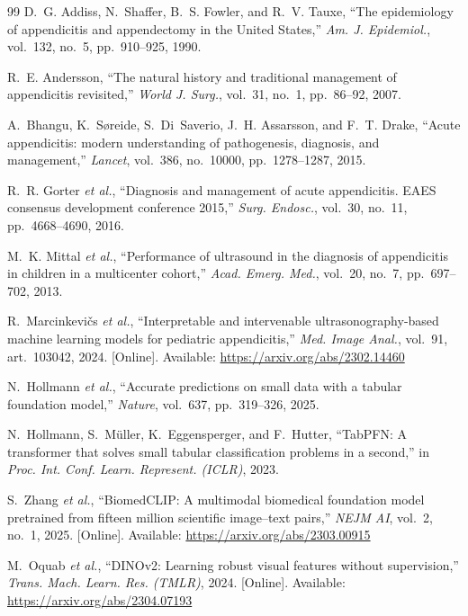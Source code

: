 \documentclass[journal]{IEEEtran}
\begin{document}
\begin{thebibliography}{99}
 D.~G. Addiss, N.~Shaffer, B.~S. Fowler, and R.~V.
Tauxe, ``The epidemiology of appendicitis and appendectomy in the United States,''
\emph{Am. J. Epidemiol.}, vol.~132, no.~5, pp.~910--925, 1990.

 R.~E. Andersson, ``The natural history and traditional
management of appendicitis revisited,'' \emph{World J. Surg.}, vol.~31, no.~1,
pp.~86--92, 2007.

 A.~Bhangu, K.~S{\o}reide, S.~Di~Saverio, J.~H. Assarsson, and
F.~T. Drake, ``Acute appendicitis: modern understanding of pathogenesis, diagnosis, and
management,'' \emph{Lancet}, vol.~386, no.~10000, pp.~1278--1287, 2015.

 R.~R. Gorter \emph{et al.}, ``Diagnosis and management of
acute appendicitis. EAES consensus development conference 2015,'' \emph{Surg. Endosc.},
vol.~30, no.~11, pp.~4668--4690, 2016.

 M.~K. Mittal \emph{et al.}, ``Performance of ultrasound
in the diagnosis of appendicitis in children in a multicenter cohort,'' \emph{Acad.
Emerg. Med.}, vol.~20, no.~7, pp.~697--702, 2013.

 R.~Marcinkevi\v{c}s \emph{et al.},
``Interpretable and intervenable ultrasonography-based machine learning models for
pediatric appendicitis,'' \emph{Med. Image Anal.}, vol.~91, art.~103042, 2024.
[Online]. Available: \url{https://arxiv.org/abs/2302.14460}

 N.~Hollmann \emph{et al.}, ``Accurate predictions on
small data with a tabular foundation model,'' \emph{Nature}, vol.~637, pp.~319--326,
2025.

 N.~Hollmann, S.~M\"uller, K.~Eggensperger, and F.~Hutter,
``TabPFN: A transformer that solves small tabular classification problems in a second,''
in \emph{Proc. Int. Conf. Learn. Represent. (ICLR)}, 2023.

 S.~Zhang \emph{et al.}, ``BiomedCLIP: A multimodal
biomedical foundation model pretrained from fifteen million scientific image--text
pairs,'' \emph{NEJM AI}, vol.~2, no.~1, 2025. [Online]. Available:
\url{https://arxiv.org/abs/2303.00915}

 M.~Oquab \emph{et al.}, ``DINOv2: Learning robust visual
features without supervision,'' \emph{Trans. Mach. Learn. Res. (TMLR)}, 2024. [Online].
Available: \url{https://arxiv.org/abs/2304.07193}


\end{thebibliography}
\end{document}
